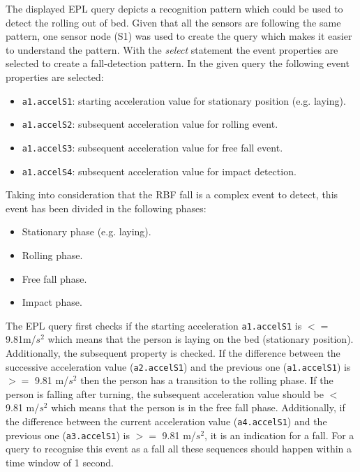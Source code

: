 \documentclass[review]{elsarticle}
\begin{document}
The displayed EPL query depicts a recognition pattern which could be used to detect the rolling out of bed. Given that all the sensors are following the same pattern, one sensor node (S1) was used to create the query which makes it easier to understand the pattern. With the \textit{select} statement the event properties are selected to create a fall-detection pattern. In the given query the following event properties are selected:
\begin{itemize}
  \item \texttt{a1.accelS1}: starting acceleration value for stationary position (e.g. laying).
  \item \texttt{a1.accelS2}: subsequent acceleration value for rolling event.
  \item \texttt{a1.accelS3}: subsequent acceleration value for free fall event.
  \item \texttt{a1.accelS4}: subsequent acceleration value for impact detection.
\end{itemize}

Taking into consideration that the RBF fall is a complex event to detect, this event has been divided in the following phases:

\begin{itemize}
  \item Stationary phase (e.g. laying).
  \item Rolling phase.
  \item Free fall phase.
  \item Impact phase.
\end{itemize}

The EPL query first checks if the starting acceleration \texttt{a1.accelS1} is $<=$ 9.81m/$s^2$ which means that the person is laying 
on the bed (stationary position). Additionally, the subsequent property is checked. If the difference between the successive 
acceleration value (\texttt{a2.accelS1}) and the previous one (\texttt{a1.accelS1}) is $>=$ 9.81 m/$s^2$ then the person has a transition to 
the rolling phase. If the person is falling after turning, the subsequent acceleration value should be $<$ 9.81 m/$s^2$ 
which means that the person is in the free fall phase. Additionally, if the difference between the current acceleration value 
(\texttt{a4.accelS1}) and the previous one (\texttt{a3.accelS1}) is
$>=$ 9.81 m/$s^2$, it is an indication for a fall. For a query to
recognise this event as a fall all these sequences should happen within a time window of 1 second.
\end{document}
